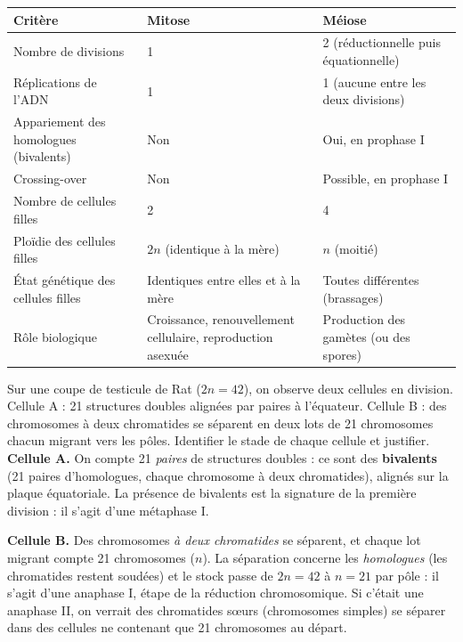 \documentclass[11pt]{article}
\newcommand{\cle}[1]{{\popxbold\color{popdark}#1}}
\begin{document}
\begin{center}
\begin{tabularx}{\linewidth}{|l|X|X|}
\hline
\rowcolor{popblueL} \textbf{Critère} & \textbf{Mitose} & \textbf{Méiose} \\
\hline
Nombre de divisions & 1 & 2 (réductionnelle puis équationnelle) \\
\hline
Réplications de l'ADN & 1 & 1 (aucune entre les deux divisions) \\
\hline
Appariement des homologues (bivalents) & Non & Oui, en prophase I \\
\hline
Crossing-over & Non & Possible, en prophase I \\
\hline
Nombre de cellules filles & 2 & 4 \\
\hline
Ploïdie des cellules filles & $2n$ (identique à la mère) & $n$ (moitié) \\
\hline
État génétique des cellules filles & Identiques entre elles et à la mère & Toutes différentes (brassages) \\
\hline
Rôle biologique & Croissance, renouvellement cellulaire, reproduction asexuée & Production des gamètes (ou des spores) \\
\hline
\end{tabularx}
\end{center}

\begin{exoresolu}
Sur une coupe de testicule de Rat ($2n = 42$), on observe deux cellules en division. Cellule A : 21 structures doubles alignées par paires à l'équateur. Cellule B : des chromosomes à deux chromatides se séparent en deux lots de 21 chromosomes chacun migrant vers les pôles. Identifier le stade de chaque cellule et justifier.
\tcblower
\textbf{Cellule A.} On compte 21 \emph{paires} de structures doubles : ce sont des \textbf{bivalents} (21 paires d'homologues, chaque chromosome à deux chromatides), alignés sur la plaque équatoriale. La présence de bivalents est la signature de la première division : il s'agit d'une \cle{métaphase I}.

\textbf{Cellule B.} Des chromosomes \emph{à deux chromatides} se séparent, et chaque lot migrant compte 21 chromosomes ($n$). La séparation concerne les \emph{homologues} (les chromatides restent soudées) et le stock passe de $2n = 42$ à $n = 21$ par pôle : il s'agit d'une \cle{anaphase I}, étape de la réduction chromosomique. Si c'était une anaphase II, on verrait des chromatides sœurs (chromosomes simples) se séparer dans des cellules ne contenant que 21 chromosomes au départ.
\end{exoresolu}
\end{document}
